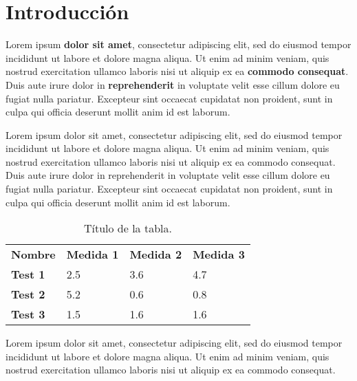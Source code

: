 \chapter{Introducción}

Lorem ipsum \textbf{dolor sit amet}, consectetur adipiscing elit, sed do eiusmod tempor incididunt ut labore et dolore magna aliqua. Ut enim ad minim veniam, quis nostrud exercitation ullamco laboris nisi ut aliquip ex ea \textbf{commodo consequat}. Duis aute irure dolor in \textbf{reprehenderit} in voluptate velit esse cillum dolore eu fugiat nulla pariatur. Excepteur sint occaecat cupidatat non proident, sunt in culpa qui officia deserunt mollit anim id est laborum.


Lorem ipsum dolor sit amet, consectetur adipiscing elit, sed do eiusmod tempor incididunt ut labore et dolore magna aliqua. Ut enim ad minim veniam, quis nostrud exercitation ullamco laboris nisi ut aliquip ex ea commodo consequat. Duis aute irure dolor in reprehenderit in voluptate velit esse cillum dolore eu fugiat nulla pariatur. Excepteur sint occaecat cupidatat non proident, sunt in culpa qui officia deserunt mollit anim id est laborum.

\begin{table}[h!]
	\centering
	\begin{tabular}{llll}
		\textbf{Nombre} & \textbf{Medida 1} & \textbf{Medida 2} & \textbf{Medida 3} \\
		\textbf{Test 1} & 2.5               & 3.6               & 4.7               \\
		\textbf{Test 2} & 5.2               & 0.6               & 0.8               \\
		\textbf{Test 3} & 1.5               & 1.6               & 1.6              
	\end{tabular}
	\caption{Título de la tabla.}
\end{table}

Lorem ipsum dolor sit amet, consectetur adipiscing elit, sed do eiusmod tempor incididunt ut labore et dolore magna aliqua. Ut enim ad minim veniam, quis nostrud exercitation ullamco laboris nisi ut aliquip ex ea commodo consequat.